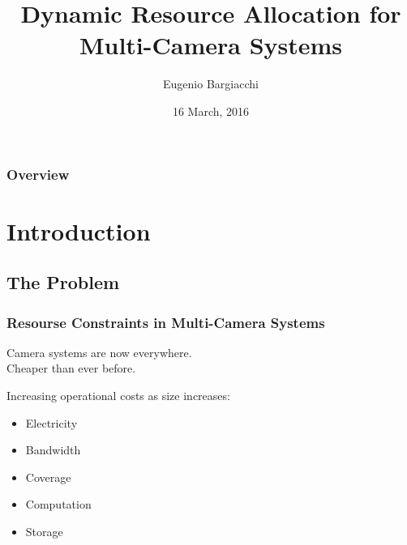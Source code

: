 \documentclass[xcolor={dvipsnames}]{beamer}
\title[Dynamic Resource Allocation]{Dynamic Resource Allocation for Multi-Camera Systems} %
\author{Eugenio Bargiacchi} %
\institute[UvA] %
{
University of Amsterdam \\ %
\medskip
\textit{svalorzen@gmail.com} %
}
\date{16 March, 2016} %
\begin{document}
\begin{frame}
\titlepage %
\end{frame}

\begin{frame}
\frametitle{Overview} %
\tableofcontents %
\end{frame}


\section{Introduction}

\subsection{The Problem}
\begin{frame}
\frametitle{Resourse Constraints in Multi-Camera Systems}

\begin{block}{}
Camera systems are now everywhere. \\
Cheaper than ever before.
\end{block}
\begin{block}{}
Increasing operational costs as size increases:
\begin{itemize}
\item Electricity
\item Bandwidth
\item Coverage
\item Computation
\item Storage
\end{itemize}
\end{block}
\end{frame}
\end{document}
